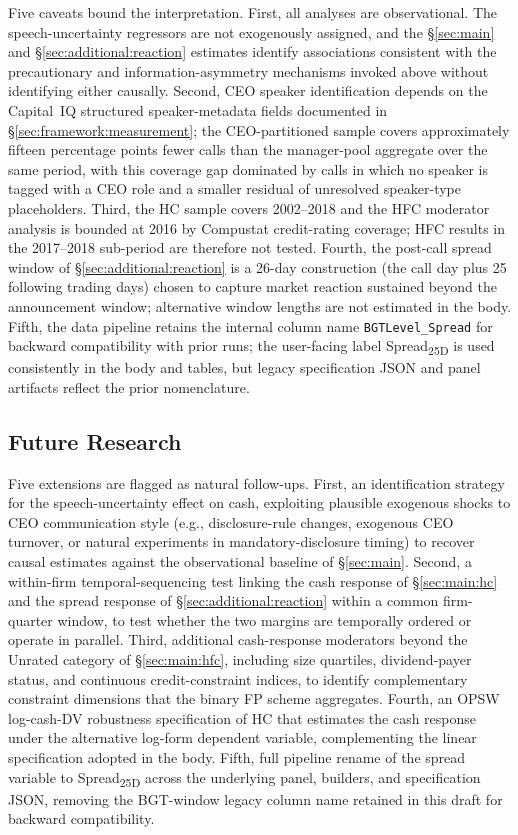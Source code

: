 Five caveats bound the interpretation. First, all analyses are observational. The speech-uncertainty regressors are not exogenously assigned, and the \S\ref{sec:main} and \S\ref{sec:additional:reaction} estimates identify associations consistent with the precautionary and information-asymmetry mechanisms invoked above without identifying either causally. Second, CEO speaker identification depends on the Capital~IQ structured speaker-metadata fields documented in \S\ref{sec:framework:measurement}; the CEO-partitioned sample covers approximately fifteen percentage points fewer calls than the manager-pool aggregate over the same period, with this coverage gap dominated by calls in which no speaker is tagged with a CEO role and a smaller residual of unresolved speaker-type placeholders. Third, the HC sample covers 2002--2018 and the HFC moderator analysis is bounded at 2016 by Compustat credit-rating coverage; HFC results in the 2017--2018 sub-period are therefore not tested. Fourth, the post-call spread window of \S\ref{sec:additional:reaction} is a 26-day construction (the call day plus 25 following trading days) chosen to capture market reaction sustained beyond the announcement window; alternative window lengths are not estimated in the body. Fifth, the data pipeline retains the internal column name \texttt{BGTLevel\_Spread} for backward compatibility with prior runs; the user-facing label Spread\textsubscript{25D} is used consistently in the body and tables, but legacy specification JSON and panel artifacts reflect the prior nomenclature.

\subsection{Future Research}

Five extensions are flagged as natural follow-ups. First, an identification strategy for the speech-uncertainty effect on cash, exploiting plausible exogenous shocks to CEO communication style (e.g., disclosure-rule changes, exogenous CEO turnover, or natural experiments in mandatory-disclosure timing) to recover causal estimates against the observational baseline of \S\ref{sec:main}. Second, a within-firm temporal-sequencing test linking the cash response of \S\ref{sec:main:hc} and the spread response of \S\ref{sec:additional:reaction} within a common firm-quarter window, to test whether the two margins are temporally ordered or operate in parallel. Third, additional cash-response moderators beyond the Unrated category of \S\ref{sec:main:hfc}, including size quartiles, dividend-payer status, and continuous credit-constraint indices, to identify complementary constraint dimensions that the binary FP scheme aggregates. Fourth, an OPSW log-cash-DV robustness specification of HC that estimates the cash response under the alternative log-form dependent variable, complementing the linear  specification adopted in the body. Fifth, full pipeline rename of the spread variable to Spread\textsubscript{25D} across the underlying panel, builders, and specification JSON, removing the BGT-window legacy column name retained in this draft for backward compatibility.

